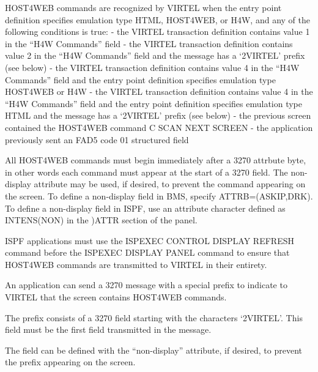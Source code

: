 \documentclass[letterpaper,10pt,english]{sphinxmanual}
\begin{document}

HOST4WEB commands are recognized by VIRTEL when the entry point definition specifies emulation type HTML,
HOST4WEB, or H4W, and any of the following conditions is true:
- the VIRTEL transaction definition contains value 1 in the “H4W Commands” field
- the VIRTEL transaction definition contains value 2 in the “H4W Commands” field and the message has a ‘2VIRTEL’ prefix (see below)
- the VIRTEL transaction definition contains value 4 in the “H4W Commands” field and the entry point definition specifies emulation type HOST4WEB or H4W
- the VIRTEL transaction definition contains value 4 in the “H4W Commands” field and the entry point definition specifies emulation type HTML and the message has a ‘2VIRTEL’ prefix (see below)
- the previous screen contained the HOST4WEB command C SCAN NEXT SCREEN
- the application previously sent an FAD5 code 01 structured field

All HOST4WEB commands must begin immediately after a 3270 attrbute byte, in other words each command must
appear at the start of a 3270 field. The non-display attribute may be used, if desired, to prevent the command
appearing on the screen. To define a non-display field in BMS, specify ATTRB=(ASKIP,DRK). To define a non-display field
in ISPF, use an attribute character defined as INTENS(NON) in the )ATTR section of the panel.

ISPF applications must use the ISPEXEC CONTROL DISPLAY REFRESH command before the ISPEXEC DISPLAY PANEL
command to ensure that HOST4WEB commands are transmitted to VIRTEL in their entirety.


An application can send a 3270 message with a special prefix to indicate to VIRTEL that the screen contains HOST4WEB
commands.

The prefix consists of a 3270 field starting with the characters ‘2VIRTEL’. This field must be the first field transmitted in
the message.

The field can be defined with the “non-display” attribute, if desired, to prevent the prefix appearing on the screen.



\begin{sphinxVerbatim}[commandchars=\\\{\}]
  
\end{sphinxVerbatim}
\end{document}
